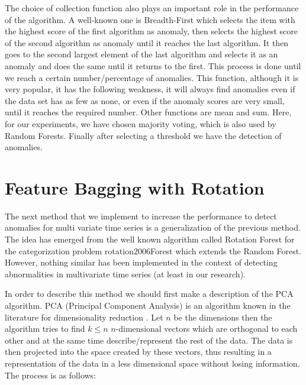 \documentclass[a4paper,12pt]{report}
\theoremstyle{definitionNODot}
\begin{document}
	The choice of collection function also plays an important role in the performance of the algorithm. A well-known one is Breadth-First which selects the item with the highest score of the first algorithm as anomaly, then selects the highest score of the second algorithm as anomaly until it reaches the last algorithm. It then goes to the second largest element of the last algorithm and selects it as an anomaly and does the same until it returns to the first. This process is done until we reach a certain number/percentage of anomalies. This function, although it is very popular, it has the following weakness, it will always find anomalies even if the data set has as few as none, or even if the anomaly scores are very small, until it reaches the required number. Other functions are mean and sum. Here, for our experiments, we have chosen majority voting, which is also used by Random Forests. Finally after selecting a threshold we have the detection of anomalies.
	
	\section{Feature Bagging with Rotation}
	The next method that we implement to increase the performance to detect anomalies for multi variate time series is a generalization of the previous method. The idea has emerged from the well known algorithm called Rotation Forest for the categorization problem {rotation2006Forest} which extends the Random Forest. However, nothing similar has been implemented in the context of detecting abnormalities in multivariate time series (at least in our research).
	
	In order to describe this method we should first make a description of the PCA algorithm. PCA (Principal Component Analysis) is an algorithm known in the literature for dimensionality reduction \cite{han2012mining}. Let $n$ be the dimensions then the algorithm tries to find $k\leq n$ $n\text{-dimensional}$ vectors which are orthogonal to each other and at the same time describe/represent the rest of the data. The data is then projected into the space created by these vectors, thus resulting in a representation of the data in a less dimensional space without losing information. The process is as follows:
	
\end{document}
